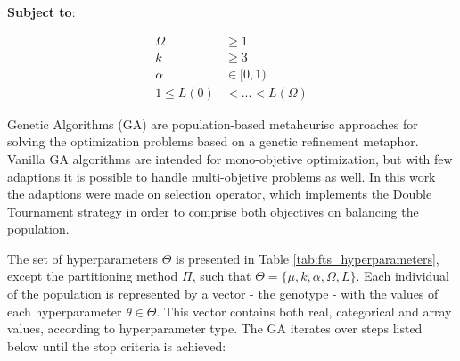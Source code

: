 \textbf{Subject to}:

\begin{align}
\Omega &\geq 1  \label{eqn:hyperopt_order}\\
k &\geq 3  \label{eqn:hyperopt_num_partitions}\\
\alpha &\in [0,1)  \label{eqn:hyperopt_alpha_cut}\\
1 \leq L(0) & < ... < L(\Omega)  \label{eqn:hyperopt_lag_inc}
\end{align}

Genetic Algorithms (GA) are population-based metaheurisc approaches for solving the optimization problems based on a genetic refinement metaphor. Vanilla GA algorithms are intended for mono-objetive optimization, but with few adaptions it is possible to handle multi-objetive problems as well. In this work the adaptions were made on selection operator, which implements the Double Tournament strategy in order to comprise both objectives on balancing the population.

The set of hyperparameters $\Theta$ is presented in Table \ref{tab:fts_hyperparameters}, except the partitioning method $\Pi$, such that $\Theta = \{\mu,k,\alpha,\Omega,L\}$. Each individual of the population is represented by a vector - the genotype - with the values of each hyperparameter $\theta \in \Theta$. This vector contains both real, categorical and array values, according to hyperparameter type. The GA iterates over steps listed below until the stop criteria is achieved:

